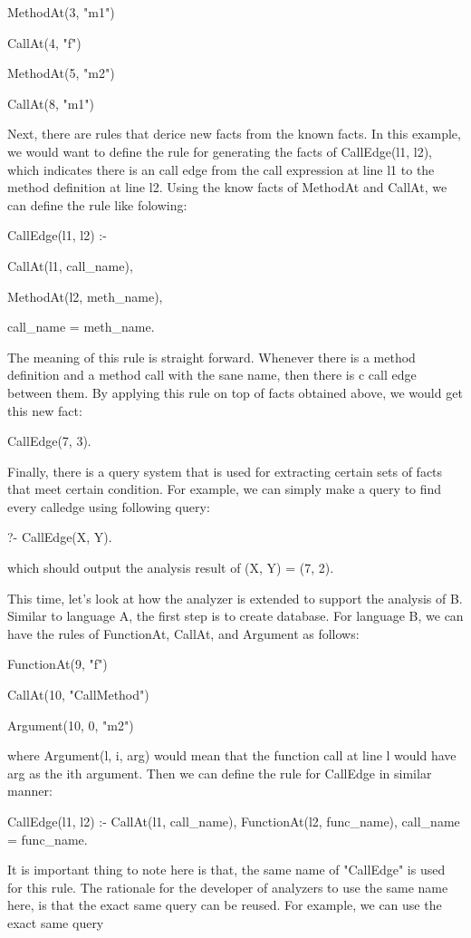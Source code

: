 MethodAt(3, "m1")

CallAt(4, "f")

MethodAt(5, "m2")

CallAt(8, "m1")

Next, there are rules that derice new facts from the known facts.  In this
example, we would want to define the rule for generating the facts of
CallEdge(l1, l2), which indicates there is an call edge from the call
expression at line l1 to the method definition at line l2. Using the know facts
of MethodAt and CallAt, we can define the rule like folowing:

CallEdge(l1, l2) :-

    CallAt(l1, call\_name),
    
    MethodAt(l2, meth\_name),
    
    call\_name = meth\_name.

The meaning of this rule is straight forward. Whenever there is a method
definition and a method call with the sane name, then there is c call edge
between them.  By applying this rule on top of facts obtained above, we would
get this new fact:

CallEdge(7, 3).

Finally, there is a query system that is used for extracting certain sets of
facts that meet certain condition. For example, we can simply make a query to
find every calledge using following query:

?- CallEdge(X, Y).

which should output the analysis result of (X, Y) = (7, 2).

This time, let's look at how the analyzer is extended to support the analysis
of B. Similar to language A, the first step is to create database. For language
B, we can have the rules of FunctionAt, CallAt, and Argument as follows:

FunctionAt(9, "f")

CallAt(10, "CallMethod")

Argument(10, 0, "m2")

where Argument(l, i, arg) would mean that the function call at line l would
have arg as the ith argument.  Then we can define the rule for CallEdge in
similar manner:

CallEdge(l1, l2) :-
    CallAt(l1, call\_name),
    FunctionAt(l2, func\_name),
    call\_name = func\_name.

It is important thing to note here is that, the same name of "CallEdge" is used
for this rule. The rationale for the developer of analyzers to use the same
name here, is that the exact same query can be reused. For example, we can use
the exact same query

